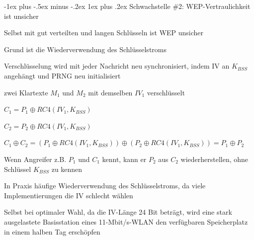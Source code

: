 \documentclass[a4paper]{article}
\makeatletter
\renewcommand{\subsubsection}{\@startsection{subsubsection}{3}{0mm}%
 {-1ex plus -.5ex minus -.2ex}%
 {1ex plus .2ex}%
 {\normalfont\small\bfseries}}
\makeatother
\begin{document}
\begin{multicols}{3}
      \subsubsection{Schwachstelle \#2: WEP-Vertraulichkeit ist unsicher}
      \begin{itemize*}
            \item Selbst mit gut verteilten und langen Schlüsseln ist WEP unsicher
            \item Grund ist die Wiederverwendung des Schlüsselstroms
            \begin{itemize*}
                  \item Verschlüsselung wird mit jeder Nachricht neu synchronisiert, indem IV an $K_{BSS}$ angehängt und PRNG neu initialisiert
                  \item zwei Klartexte $M_1$ und $M_2$ mit demselben $IV_1$ verschlüsselt
                  \item $C_1 = P_1 \oplus RC4 (IV_1 , K_{BSS})$
                  \item $C_2 = P_2 \oplus RC4 (IV_1 , K_{BSS})$
                  \item $C_1 \oplus C_2 = (P_1 \oplus RC4 (IV_1, K_{BSS})) \oplus (P_2\oplus RC4 (IV_1 , K_{BSS})) = P_1 \oplus P_2$
                  \item Wenn Angreifer z.B. $P_1$ und $C_1$ kennt, kann er $P_2$ aus $C_2$ wiederherstellen, ohne Schlüssel $K_{BSS}$ zu kennen
            \end{itemize*}
            \item In Praxis häufige Wiederverwendung des Schlüsselstroms, da viele Implementierungen die IV schlecht wählen
            \item Selbst bei optimaler Wahl, da die IV-Länge 24 Bit beträgt, wird eine stark ausgelastete Basisstation eines 11-Mbit/s-WLAN den verfügbaren Speicherplatz in einem halben Tag erschöpfen
      \end{itemize*}


\end{multicols}
\end{document}
